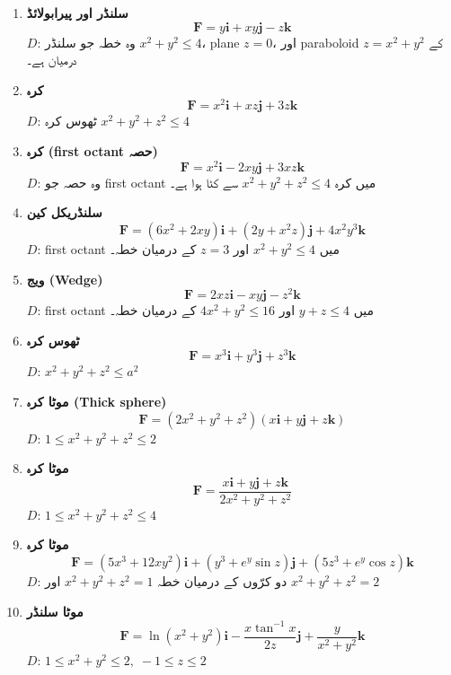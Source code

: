 \begin{enumerate}
\begin{enumerate}
\item \textbf{سلنڈر اور پیرابولائڈ}
\[
\mathbf{F} = y\mathbf{i} + xy\mathbf{j} - z\mathbf{k}
\]
\( D \): وہ خطہ جو سلنڈر \( x^2+y^2 \le 4 \)، plane \( z=0 \)، اور paraboloid \( z=x^2+y^2 \) کے درمیان ہے۔

\item \textbf{کرہ}
\[
\mathbf{F} = x^2\mathbf{i} + xz\mathbf{j} + 3z\mathbf{k}
\]
\( D \): ٹھوس کرہ \( x^2+y^2+z^2 \le 4 \)

\item \textbf{کرہ (first octant حصہ)}
\[
\mathbf{F} = x^2\mathbf{i} - 2xy\mathbf{j} + 3xz\mathbf{k}
\]
\( D \): وہ حصہ جو first octant میں کرہ \( x^2+y^2+z^2 \le 4 \) سے کٹا ہوا ہے۔

\item \textbf{سلنڈریکل کین}
\[
\mathbf{F} = (6x^2 + 2xy)\mathbf{i} + (2y + x^2z)\mathbf{j} + 4x^2y^3\mathbf{k}
\]
\( D \): first octant میں \( x^2+y^2 \le 4 \) اور \( z=3 \) کے درمیان خطہ۔

\item \textbf{ویج (Wedge)}
\[
\mathbf{F} = 2xz\mathbf{i} - xy\mathbf{j} - z^2\mathbf{k}
\]
\( D \): first octant میں \( y+z \le 4 \) اور \( 4x^2+y^2 \le 16 \) کے درمیان خطہ۔

\item \textbf{ٹھوس کرہ}
\[
\mathbf{F} = x^3\mathbf{i} + y^3\mathbf{j} + z^3\mathbf{k}
\]
\( D \): \( x^2+y^2+z^2 \le a^2 \)

\item \textbf{موٹا کرہ (Thick sphere)}
\[
\mathbf{F} = (2x^2+y^2+z^2)(x\mathbf{i}+y\mathbf{j}+z\mathbf{k})
\]
\( D \): \( 1 \le x^2+y^2+z^2 \le 2 \)

\item \textbf{موٹا کرہ}
\[
\mathbf{F} = \frac{x\mathbf{i}+y\mathbf{j}+z\mathbf{k}}{2x^2+y^2+z^2}
\]
\( D \): \( 1 \le x^2+y^2+z^2 \le 4 \)

\item \textbf{موٹا کرہ}
\[
\mathbf{F} =
(5x^3+12xy^2)\mathbf{i}
+
(y^3+e^{y}\sin z)\mathbf{j}
+
(5z^3+e^{y}\cos z)\mathbf{k}
\]
\( D \): دو کرّوں کے درمیان خطہ \( x^2+y^2+z^2=1 \) اور \( x^2+y^2+z^2=2 \)

\item \textbf{موٹا سلنڈر}
\[
\mathbf{F} =
\ln(x^2+y^2)\mathbf{i}
-
\frac{x\tan^{-1}x}{2z}\mathbf{j}
+
\frac{y}{x^2+y^2}\mathbf{k}
\]
\( D \): \( 1 \le x^2+y^2 \le 2,\; -1 \le z \le 2 \)
\end{enumerate}



\end{enumerate}
